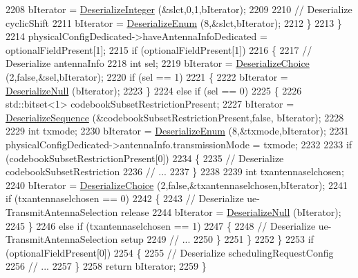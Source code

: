 \begin{DoxyCode}
2208           bIterator = \hyperlink{classns3_1_1Asn1Header_a49802c9af30018b078150e866b6ecae2}{DeserializeInteger} (&slct,0,1,bIterator);
2209 
2210           \textcolor{comment}{// Deserialize cyclicShift}
2211           bIterator = \hyperlink{classns3_1_1Asn1Header_a4fcc253e0eec3483c775b005c1875f2d}{DeserializeEnum} (8,&slct,bIterator);
2212         \}
2213     \}
2214   physicalConfigDedicated->haveAntennaInfoDedicated = optionalFieldPresent[1];
2215   \textcolor{keywordflow}{if} (optionalFieldPresent[1])
2216     \{
2217       \textcolor{comment}{// Deserialize antennaInfo}
2218       \textcolor{keywordtype}{int} sel;
2219       bIterator = \hyperlink{classns3_1_1Asn1Header_a0af5881f07a0549a8693a1b75c229a90}{DeserializeChoice} (2,\textcolor{keyword}{false},&sel,bIterator);
2220       \textcolor{keywordflow}{if} (sel == 1)
2221         \{
2222           bIterator = \hyperlink{classns3_1_1Asn1Header_a29bd4508f3f1ef636b3480f524fac0ce}{DeserializeNull} (bIterator);
2223         \}
2224       \textcolor{keywordflow}{else} \textcolor{keywordflow}{if} (sel == 0)
2225         \{
2226           std::bitset<1> codebookSubsetRestrictionPresent;
2227           bIterator = \hyperlink{classns3_1_1Asn1Header_a58c68bb97ba3fe2e8fcdd7c208d672b2}{DeserializeSequence} (&codebookSubsetRestrictionPresent,\textcolor{keyword}{false},
      bIterator);
2228 
2229           \textcolor{keywordtype}{int} txmode;
2230           bIterator = \hyperlink{classns3_1_1Asn1Header_a4fcc253e0eec3483c775b005c1875f2d}{DeserializeEnum} (8,&txmode,bIterator);
2231           physicalConfigDedicated->antennaInfo.transmissionMode = txmode;
2232 
2233           \textcolor{keywordflow}{if} (codebookSubsetRestrictionPresent[0])
2234             \{
2235               \textcolor{comment}{// Deserialize codebookSubsetRestriction}
2236               \textcolor{comment}{// ...}
2237             \}
2238 
2239           \textcolor{keywordtype}{int} txantennaselchosen;
2240           bIterator = \hyperlink{classns3_1_1Asn1Header_a0af5881f07a0549a8693a1b75c229a90}{DeserializeChoice} (2,\textcolor{keyword}{false},&txantennaselchosen,bIterator);
2241           \textcolor{keywordflow}{if} (txantennaselchosen == 0)
2242             \{
2243               \textcolor{comment}{// Deserialize ue-TransmitAntennaSelection release}
2244               bIterator = \hyperlink{classns3_1_1Asn1Header_a29bd4508f3f1ef636b3480f524fac0ce}{DeserializeNull} (bIterator);
2245             \}
2246           \textcolor{keywordflow}{else} \textcolor{keywordflow}{if} (txantennaselchosen == 1)
2247             \{
2248               \textcolor{comment}{// Deserialize ue-TransmitAntennaSelection setup}
2249               \textcolor{comment}{// ...}
2250             \}
2251         \}
2252     \}
2253   \textcolor{keywordflow}{if} (optionalFieldPresent[0])
2254     \{
2255       \textcolor{comment}{// Deserialize schedulingRequestConfig}
2256       \textcolor{comment}{// ...}
2257     \}
2258   \textcolor{keywordflow}{return} bIterator;
2259 \}
\end{DoxyCode}


